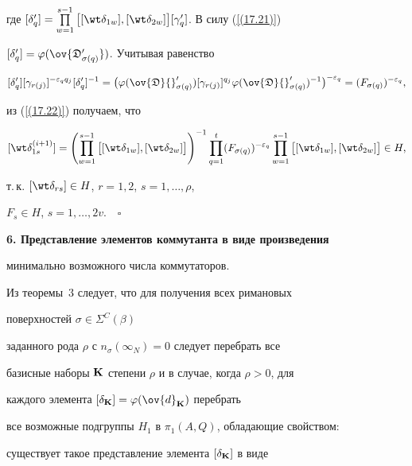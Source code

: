 где $[\delta'_q]=\PL^{s-1}_{w=1}\big[[\wt\delta_{1w}],[\wt\delta_{2w}]\big]


[\gamma'_q]$. В силу (\ref{(17.21)})


$[\delta'_q]=\varphi(\ov{\frak D'_{\sigma(q)}})$. Учитывая равенство


$$


[\delta'_q][\gamma_{r(j)}]^{-\varepsilon_q q_j}


[\delta'_q]^{-1}=\big(\varphi


(\ov{\frak D}{}'_{\sigma(q)})[\gamma_{r(j)}]^{q_j}


\varphi(\ov{\frak D}{}'_{\sigma(q)})^{-1}\big)^{-\varepsilon_q}=


(F_{\sigma(q)})^{-\varepsilon_q},


$$


из (\ref{(17.22)}) получаем, что


$$


[\wt\delta^{(i+1)}_{1s}]=\left(\prod^{s-1}_{w=1}\big[[\wt\delta_{1w}],


[\wt\delta_{2w}]\big]\right)^{-1}


\prod_{q=1}^t(F_{\sigma(q)})^{-\varepsilon_q} 


\prod^{s-1}_{w=1}\big[[\wt\delta_{1w}],[\wt\delta_{2w}]\big]\in H,


$$


т.\,к. $[\wt\delta_{rs}]\in H$, $r=1,2$, $s=1,\dotsc,\rho$,


$F_s\in H$, $s=1,\dotsc,2v$.$\quad\square$


\medskip





{\bf 6. Представление элементов коммутанта в виде произведения


минимально возможного числа коммутаторов.}


Из теоремы~3 следует, что для получения всех римановых 


поверхностей $\sigma\in\Sigma^C(\beta)$


заданного рода $\rho$ с $n_{\sigma}(\infty_N)=0$ следует перебрать все 


базисные наборы $\bold K$ степени $\rho$ и в случае, когда $\rho>0$, для 


каждого элемента $[\delta_{\bold K}]=\varphi(\ov {d}_{\bold K})$ перебрать 


все возможные подгруппы $H_1$ в $\pi_1(A,Q)$, обладающие свойством: 


существует такое представление элемента $[\delta_{\bold K}]$ в виде


